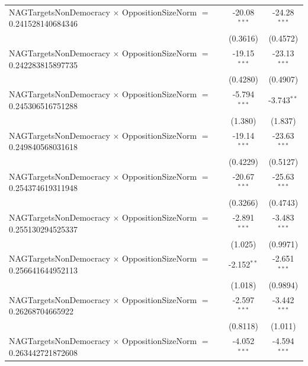 \begin{tabular}{lcc}
   NAGTargetsNonDemocracy $\times$ OppositionSizeNorm $=$ 0.241528140684346     & -20.08$^{***}$       & -24.28$^{***}$\\   
                                                                                & (0.3616)             & (0.4572)\\   
   NAGTargetsNonDemocracy $\times$ OppositionSizeNorm $=$ 0.242283815897735     & -19.15$^{***}$       & -23.13$^{***}$\\   
                                                                                & (0.4280)             & (0.4907)\\   
   NAGTargetsNonDemocracy $\times$ OppositionSizeNorm $=$ 0.245306516751288     & -5.794$^{***}$       & -3.743$^{**}$\\   
                                                                                & (1.380)              & (1.837)\\   
   NAGTargetsNonDemocracy $\times$ OppositionSizeNorm $=$ 0.249840568031618     & -19.14$^{***}$       & -23.63$^{***}$\\   
                                                                                & (0.4229)             & (0.5127)\\   
   NAGTargetsNonDemocracy $\times$ OppositionSizeNorm $=$ 0.254374619311948     & -20.67$^{***}$       & -25.63$^{***}$\\   
                                                                                & (0.3266)             & (0.4743)\\   
   NAGTargetsNonDemocracy $\times$ OppositionSizeNorm $=$ 0.255130294525337     & -2.891$^{***}$       & -3.483$^{***}$\\   
                                                                                & (1.025)              & (0.9971)\\   
   NAGTargetsNonDemocracy $\times$ OppositionSizeNorm $=$ 0.256641644952113     & -2.152$^{**}$        & -2.651$^{***}$\\   
                                                                                & (1.018)              & (0.9894)\\   
   NAGTargetsNonDemocracy $\times$ OppositionSizeNorm $=$ 0.26268704665922      & -2.597$^{***}$       & -3.442$^{***}$\\   
                                                                                & (0.8118)             & (1.011)\\   
   NAGTargetsNonDemocracy $\times$ OppositionSizeNorm $=$ 0.263442721872608     & -4.052$^{***}$       & -4.594$^{***}$\\   

\end{tabular}
